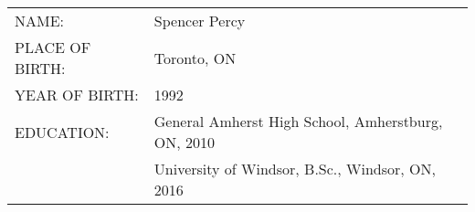 \begin{authorpage}
	
			\begin{tabular}{ l  l  }
			
				NAME: & Spencer Percy\\
				PLACE OF BIRTH: & Toronto, ON\\
				YEAR OF BIRTH: & 1992\\
				EDUCATION:& General Amherst High School, Amherstburg, ON, 2010\\
				 & University of Windsor, B.Sc.,  Windsor, ON, 2016\\

				
		\end{tabular}
		
		\end{authorpage}
		